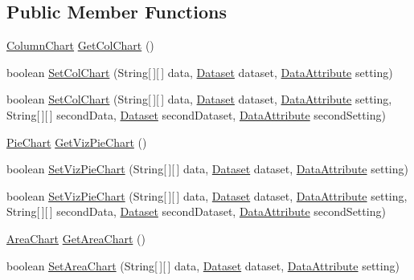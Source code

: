 \subsection*{Public Member Functions}
\begin{DoxyCompactItemize}
\item 
\hyperlink{class_column_chart}{Column\-Chart} \hyperlink{class_visualisation_aa3b086e3056acc670676337341548c35}{Get\-Col\-Chart} ()
\item 
boolean \hyperlink{class_visualisation_ac5cdad052bcbab9babaa5ecdfd2427ea}{Set\-Col\-Chart} (String\mbox{[}$\,$\mbox{]}\mbox{[}$\,$\mbox{]} data, \hyperlink{class_dataset}{Dataset} dataset, \hyperlink{class_data_attribute}{Data\-Attribute} setting)
\item 
boolean \hyperlink{class_visualisation_a118d994f12e22a0dea33925695851941}{Set\-Col\-Chart} (String\mbox{[}$\,$\mbox{]}\mbox{[}$\,$\mbox{]} data, \hyperlink{class_dataset}{Dataset} dataset, \hyperlink{class_data_attribute}{Data\-Attribute} setting, String\mbox{[}$\,$\mbox{]}\mbox{[}$\,$\mbox{]} second\-Data, \hyperlink{class_dataset}{Dataset} second\-Dataset, \hyperlink{class_data_attribute}{Data\-Attribute} second\-Setting)
\item 
\hyperlink{class_pie_chart}{Pie\-Chart} \hyperlink{class_visualisation_abe4f0b9c1cd424c7de4277934b21a99d}{Get\-Viz\-Pie\-Chart} ()
\item 
boolean \hyperlink{class_visualisation_ae459b89156fb23c84a2d5fe9ffb08f24}{Set\-Viz\-Pie\-Chart} (String\mbox{[}$\,$\mbox{]}\mbox{[}$\,$\mbox{]} data, \hyperlink{class_dataset}{Dataset} dataset, \hyperlink{class_data_attribute}{Data\-Attribute} setting)
\item 
boolean \hyperlink{class_visualisation_a2a1211b45fd9b1018191e6207d71f82a}{Set\-Viz\-Pie\-Chart} (String\mbox{[}$\,$\mbox{]}\mbox{[}$\,$\mbox{]} data, \hyperlink{class_dataset}{Dataset} dataset, \hyperlink{class_data_attribute}{Data\-Attribute} setting, String\mbox{[}$\,$\mbox{]}\mbox{[}$\,$\mbox{]} second\-Data, \hyperlink{class_dataset}{Dataset} second\-Dataset, \hyperlink{class_data_attribute}{Data\-Attribute} second\-Setting)
\item 
\hyperlink{class_area_chart}{Area\-Chart} \hyperlink{class_visualisation_a3855e21b8c0e1b0fc95febc9e445e8fc}{Get\-Area\-Chart} ()
\item 
boolean \hyperlink{class_visualisation_aedb9b8380dfdb83af933371ee1e80a51}{Set\-Area\-Chart} (String\mbox{[}$\,$\mbox{]}\mbox{[}$\,$\mbox{]} data, \hyperlink{class_dataset}{Dataset} dataset, \hyperlink{class_data_attribute}{Data\-Attribute} setting)

\end{DoxyCompactItemize}
